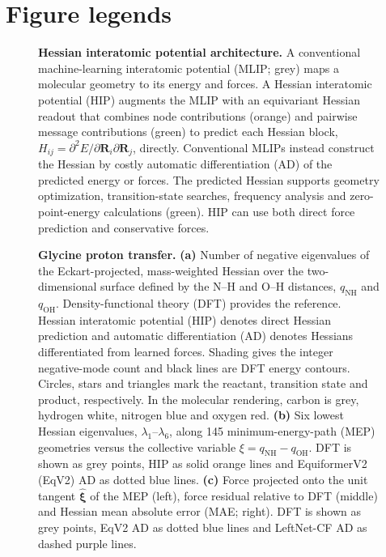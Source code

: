 \documentclass[pdflatex,sn-mathphys-num]{sn-jnl}%
\begin{document}
\clearpage
\section*{Figure legends}


\begin{figure}[htbp]
    \caption{
    \textbf{Hessian interatomic potential architecture.}
    A conventional machine-learning interatomic potential (MLIP; grey) maps a molecular geometry to its energy and forces. A Hessian interatomic potential (HIP) augments the MLIP with an equivariant Hessian readout that combines node contributions (orange) and pairwise message contributions (green) to predict each Hessian block, $H_{ij}=\partial^2 E/\partial\bm{R}_i\partial\bm{R}_j$, directly. Conventional MLIPs instead construct the Hessian by costly automatic differentiation (AD) of the predicted energy or forces. The predicted Hessian supports geometry optimization, transition-state searches, frequency analysis and zero-point-energy calculations (green). HIP can use both direct force prediction and conservative forces.
    }
    \label{fig:visual_abstract}
\end{figure}

\begin{figure}[htbp]
    \caption{
    \textbf{Glycine proton transfer.}
    \textbf{(a)} Number of negative eigenvalues of the Eckart-projected, mass-weighted Hessian over the two-dimensional surface defined by the N--H and O--H distances, $q_{\mathrm{NH}}$ and $q_{\mathrm{OH}}$. Density-functional theory (DFT) provides the reference. Hessian interatomic potential (HIP) denotes direct Hessian prediction and automatic differentiation (AD) denotes Hessians differentiated from learned forces. Shading gives the integer negative-mode count and black lines are DFT energy contours. Circles, stars and triangles mark the reactant, transition state and product, respectively. In the molecular rendering, carbon is grey, hydrogen white, nitrogen blue and oxygen red.
    \textbf{(b)} Six lowest Hessian eigenvalues, $\lambda_1$--$\lambda_6$, along 145 minimum-energy-path (MEP) geometries versus the collective variable $\xi=q_{\mathrm{NH}}-q_{\mathrm{OH}}$. DFT is shown as grey points, HIP as solid orange lines and EquiformerV2 (EqV2) AD as dotted blue lines.
    \textbf{(c)} Force projected onto the unit tangent $\widehat{\bm{\xi}}$ of the MEP (left), force residual relative to DFT (middle) and Hessian mean absolute error (MAE; right). DFT is shown as grey points, EqV2 AD as dotted blue lines and LeftNet-CF AD as dashed purple lines.
    }
    \label{fig:glycine}
\end{figure}
\end{document}
